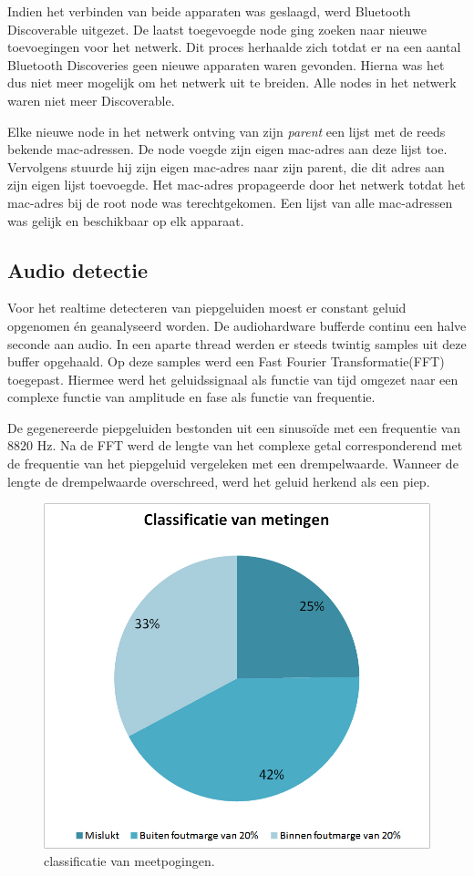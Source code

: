 \documentclass[12pt]{article}
\begin{document}
Indien het verbinden van beide apparaten was geslaagd, werd Bluetooth Discoverable uitgezet. De laatst toegevoegde node ging zoeken naar nieuwe toevoegingen voor het netwerk. Dit proces herhaalde zich totdat er na een aantal Bluetooth Discoveries geen nieuwe apparaten waren gevonden. Hierna was het dus niet meer mogelijk om het netwerk uit te breiden. Alle nodes in het netwerk waren niet meer Discoverable.

Elke nieuwe node in het netwerk ontving van zijn \textit{parent} een lijst met de reeds bekende mac-adressen. De node voegde zijn eigen mac-adres aan deze lijst toe. Vervolgens stuurde hij zijn eigen mac-adres naar zijn parent, die dit adres aan zijn eigen lijst toevoegde. Het mac-adres propageerde door het netwerk totdat het mac-adres bij de root node was terechtgekomen. Een lijst van alle mac-adressen was gelijk en beschikbaar op elk apparaat. 

\subsection{Audio detectie}
Voor het realtime detecteren van piepgeluiden moest er constant geluid opgenomen \'en geanalyseerd worden. De audiohardware bufferde continu een halve seconde aan audio. In een aparte thread werden er steeds twintig samples uit deze buffer opgehaald. Op deze samples werd een Fast Fourier Transformatie(FFT) \cite{bracewell1986fourier} toegepast. Hiermee werd het geluidssignaal als functie van tijd omgezet naar een complexe functie van amplitude en fase als functie van frequentie. 

De gegenereerde piepgeluiden bestonden uit een sinuso\"ide met een frequentie van $8820$ Hz. Na de FFT werd de lengte van het complexe getal corresponderend met de frequentie van het piepgeluid vergeleken met een drempelwaarde. Wanneer de lengte de drempelwaarde overschreed, werd het geluid herkend als een piep.

\begin{figure}[t]
\centering
\includegraphics[scale=0.4]{classificatie}
\caption{classificatie van meetpogingen.}
\label{fig:classi}
\end{figure}
\end{document}
